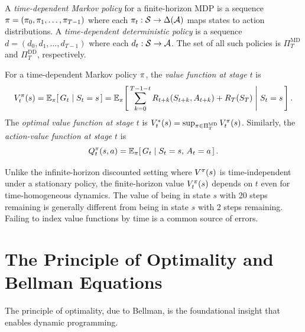 \documentclass[11pt,a4paper]{article}
\begin{document}
\begin{definition}
\label{def:td-policy}
A \emph{time-dependent Markov policy} for a finite-horizon MDP is a
sequence $\pi = (\pi_0, \pi_1, \ldots, \pi_{T-1})$
where each $\pi_t : \mathcal{S} \to \Delta(\mathcal{A})$ maps states to
action distributions. A \emph{time-dependent deterministic policy}
is a sequence $d = (d_0, d_1, \ldots, d_{T-1})$ where each
$d_t : \mathcal{S} \to \mathcal{A}$. The set of all such policies is
$\Pi^{\mathrm{MD}}_T$ and $\Pi^{\mathrm{DD}}_T$, respectively.
\end{definition}

\begin{definition}
\label{def:fh-value}
For a time-dependent Markov policy $\pi$, the \emph{value
function at stage $t$} is
\[
    V_t^\pi(s) = \mathbb{E}_\pi\!\left[\, G_t \mid S_t = s \,\right]
    = \mathbb{E}_\pi\!\left[\,
    \sum_{k=0}^{T-1-t} R_{t+k}(S_{t+k}, A_{t+k}) + R_T(S_T)
    \;\middle|\; S_t = s \,\right].
\]
The \emph{optimal value function at stage $t$} is
$V_t^*(s) = \sup_{\pi \in \Pi^{\mathrm{MD}}_T} V_t^\pi(s)$.
Similarly, the \emph{action-value function at stage $t$} is
\[
    Q_t^\pi(s,a) = \mathbb{E}_\pi\!\left[\, G_t \mid S_t = s,\,
    A_t = a \,\right].
\]
\end{definition}

\begin{warning}[title={Finite-Horizon Value Functions Are
    Time-Dependent}]
Unlike the infinite-horizon discounted setting where $V^{\pi}(s)$ is
time-independent under a stationary policy, the finite-horizon value
$V_t^\pi(s)$ depends on $t$ even for time-homogeneous dynamics.
The value of being in state $s$ with 20 steps remaining is generally
different from being in state $s$ with 2 steps remaining. Failing to
index value functions by time is a common source of errors.
\end{warning}


\section{The Principle of Optimality and Bellman Equations}
\label{sec:principle-optimality}

The principle of optimality, due to Bellman, is the foundational
insight that enables dynamic programming.
\end{document}
